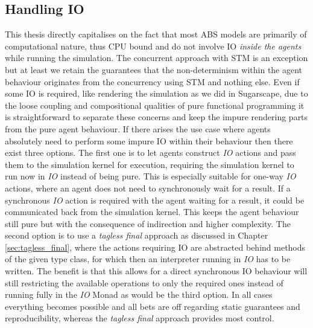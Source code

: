 \subsection{Handling IO}
This thesis directly capitalises on the fact that most ABS models are primarily of computational nature, thus CPU bound and do not involve IO \textit{inside the agents} while running the simulation. The concurrent approach with STM is an exception but at least we retain the guarantees that the non-determinism within the agent behaviour originates from the concurrency using STM and nothing else. Even if some IO is required, like rendering the simulation as we did in Sugarscape, due to the loose coupling and compositional qualities of pure functional programming it is straightforward to separate these concerns and keep the impure rendering parts from the pure agent behaviour. If there arises the use case where agents absolutely need to perform some impure IO within their behaviour then there exist three options. The first one is to let agents construct \textit{IO} actions and pass them to the simulation kernel for execution, requiring the simulation kernel to run now in \textit{IO} instead of being pure. This is especially suitable for one-way \textit{IO} actions, where an agent does not need to synchronously wait for a result. If a synchronous \textit{IO} action is required with the agent waiting for a result, it could be communicated back from the simulation kernel. This keeps the agent behaviour still pure but with the consequence of indirection and higher complexity. The second option is to use a \textit{tagless final} approach as discussed in Chapter \ref{sec:tagless_final}, where the actions requiring IO are abstracted behind methods of the given type class, for which then an interpreter running in \textit{IO} has to be written. The benefit is that this allows for a direct synchronous IO behaviour will still restricting the available operations to only the required ones instead of running fully in the \textit{IO} Monad as would be the third option. In all cases everything becomes possible and all bets are off regarding static guarantees and reproducibility, whereas the \textit{tagless final} approach provides most control.


